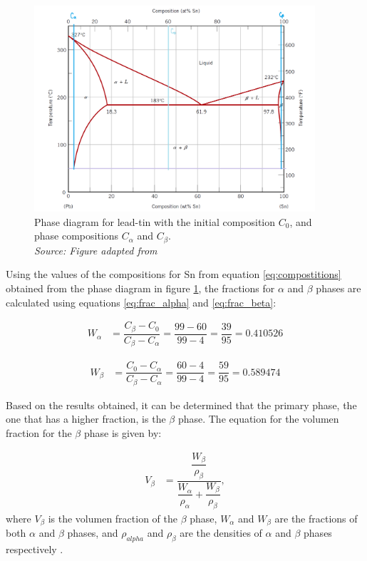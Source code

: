 \begin{figure}[h]
    \centering
    \includegraphics[width=0.93\textwidth]{graficas/diagrama.png}
    \caption{Phase diagram for lead-tin with the initial composition $C_0$, and phase compositions $C_{\alpha}$ and $C_{\beta}$.\\
    \textit{Source: Figure adapted from \citet[p.~300]{callister2010materials}}}
    \label{fig:diagrama}
\end{figure}

Using the values of the compositions for Sn from equation \ref{eq:compostitions} obtained from the phase diagram in figure \ref{fig:diagrama}, the fractions for $\alpha$ and $\beta$ phases are calculated using equations \eqref{eq:frac_alpha} and \eqref{eq:frac_beta}:

\begin{align}
    \label{eq:w_alpha}
    W_{\alpha}&=\dfrac{C_{\beta}-C_0}{C_{\beta}-C_{\alpha}} =\dfrac{99-60}{99-4} = \dfrac{39}{95} = 0.410526
\end{align}

\begin{align}
    \label{eq:w_beta}
    W_{\beta}&=\dfrac{C_0-C_{\alpha}}{C_{\beta}-C_{\alpha}} =\dfrac{60-4}{99-4} =\dfrac{59}{95} =0.589474
\end{align}

Based on the results obtained, it can be determined that the primary phase, the one that has a higher fraction, is the $\beta$ phase. The equation for the volumen fraction for the $\beta$ phase is given by:

\begin{align}
    \label{eq:vol_beta}
    V_{\beta}&=\dfrac{\dfrac{W_{\beta}}{\rho_{\beta}}}{\dfrac{W_{\alpha}}{\rho_{\alpha}}+\dfrac{W_{\beta}}{\rho_{\beta}}},
\end{align}
where $V_{\beta}$ is the volumen fraction of the $\beta$ phase, $W_{\alpha}$ and $W_{\beta}$ are the fractions of both $\alpha$ and $\beta$ phases, and $\rho_{alpha}$ and $\rho_{\beta}$ are the densities of $\alpha$ and $\beta$ phases respectively \citep[p.~293]{callister2010materials}.

